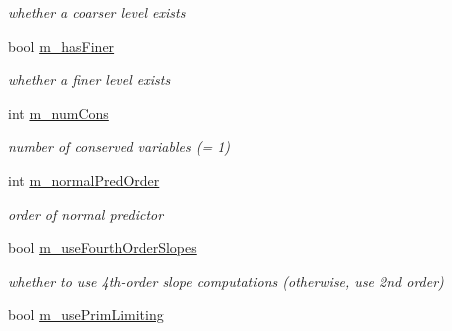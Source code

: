 \begin{DoxyCompactItemize}
\begin{DoxyCompactList}\small\item\em whether a coarser level exists \end{DoxyCompactList}\item 
\hypertarget{class_level_advect_a71f2193804df1cdb778e7f8f98eb05d0}{bool \hyperlink{class_level_advect_a71f2193804df1cdb778e7f8f98eb05d0}{m\-\_\-has\-Finer}}\label{class_level_advect_a71f2193804df1cdb778e7f8f98eb05d0}

\begin{DoxyCompactList}\small\item\em whether a finer level exists \end{DoxyCompactList}\item 
\hypertarget{class_level_advect_a8a72b368d22f9f10fa9366365038a9bb}{int \hyperlink{class_level_advect_a8a72b368d22f9f10fa9366365038a9bb}{m\-\_\-num\-Cons}}\label{class_level_advect_a8a72b368d22f9f10fa9366365038a9bb}

\begin{DoxyCompactList}\small\item\em number of conserved variables (= 1) \end{DoxyCompactList}\item 
\hypertarget{class_level_advect_a554f4194c313e68690e2eaf3bd405630}{int \hyperlink{class_level_advect_a554f4194c313e68690e2eaf3bd405630}{m\-\_\-normal\-Pred\-Order}}\label{class_level_advect_a554f4194c313e68690e2eaf3bd405630}

\begin{DoxyCompactList}\small\item\em order of normal predictor \end{DoxyCompactList}\item 
\hypertarget{class_level_advect_a1eb9a05109cd588504185e3c5ee360af}{bool \hyperlink{class_level_advect_a1eb9a05109cd588504185e3c5ee360af}{m\-\_\-use\-Fourth\-Order\-Slopes}}\label{class_level_advect_a1eb9a05109cd588504185e3c5ee360af}

\begin{DoxyCompactList}\small\item\em whether to use 4th-\/order slope computations (otherwise, use 2nd order) \end{DoxyCompactList}\item 
\hypertarget{class_level_advect_ac75d3b654493d0b22955e9c573449089}{bool \hyperlink{class_level_advect_ac75d3b654493d0b22955e9c573449089}{m\-\_\-use\-Prim\-Limiting}}\label{class_level_advect_ac75d3b654493d0b22955e9c573449089}


\end{DoxyCompactItemize}
